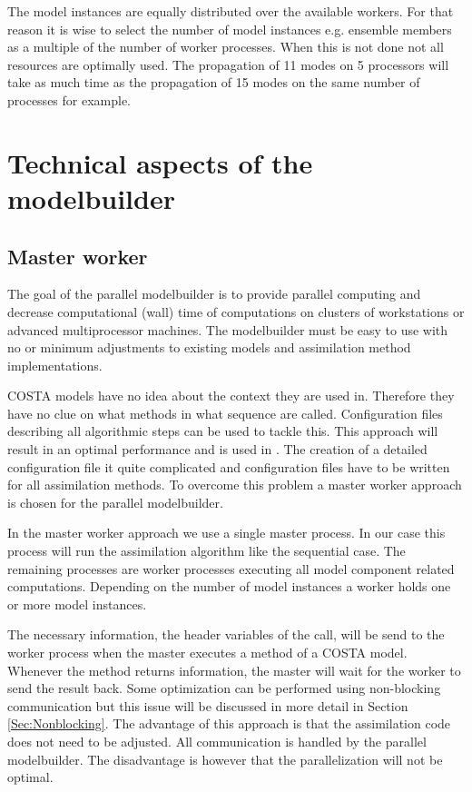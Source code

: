 The model instances are equally distributed over the available workers. For
that reason it is wise to select the number of model instances e.g.
ensemble members as a multiple of the number of worker processes. When this
is not done not all resources are optimally used. The propagation of 11
modes on 5 processors will take as much time as the propagation of 15
modes on the same number of processes for example.


\section{Technical aspects of the modelbuilder}
 \label{Sec:Technical aspects of the modelbuilder}
\subsection{Master worker}
The goal of the parallel modelbuilder is to provide parallel computing and
decrease computational (wall) time of computations on clusters of
workstations or advanced multiprocessor machines. The modelbuilder must be
easy to use with no or minimum adjustments to existing models and
assimilation method implementations.

COSTA models have no idea about the context they are used in. Therefore
they have no clue on what methods in what sequence are called.
Configuration files describing all algorithmic steps can be used to tackle
this. This approach will result in an optimal performance and is used in
\cite{Roest2002}. The creation of a detailed configuration file
it quite complicated and configuration files have to be written
for all assimilation methods. To overcome this problem a master worker
approach is chosen for the parallel modelbuilder.

In the master worker approach we use a single master process. In our case
this process will run the assimilation algorithm like the sequential case.
The remaining processes are worker processes executing all model component
related computations. Depending on the number of model instances a worker
holds one or more model instances.

The necessary information, the header variables of the call, will be send
to the worker process when the master executes a method of a COSTA model.
Whenever the method returns information, the master will wait for the
worker to send the result back. Some optimization can be performed using
non-blocking communication but this issue will be discussed in more detail
in Section \ref{Sec:Nonblocking}. The advantage of this approach is that
the assimilation code does not need to be adjusted. All communication is
handled by the parallel modelbuilder. The disadvantage is however that the
parallelization will not be optimal. 

